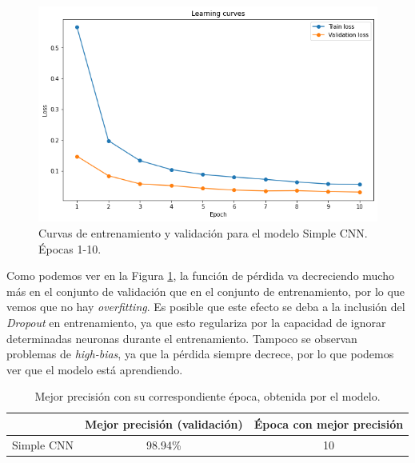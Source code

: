 \documentclass[12pt]{scrartcl}
\begin{document}
\begin{itemize}
    \begin{figure}[H]
        \centering
        \includegraphics[scale=0.48]{curvas1.png}
        \caption{Curvas de entrenamiento y validación para el modelo Simple CNN. Épocas 1-10.}
        \label{fig:curvas1}
    \end{figure}
    
    Como podemos ver en la Figura \ref{fig:curvas1}, la función de pérdida va decreciendo mucho más en el conjunto de validación que en el conjunto de entrenamiento, por lo que vemos que no hay \emph{overfitting}.
    Es posible que este efecto se deba a la inclusión del \emph{Dropout} en entrenamiento, ya que esto regulariza por la capacidad de ignorar determinadas neuronas durante el entrenamiento. Tampoco se observan 
    problemas de \emph{high-bias}, ya que la pérdida siempre decrece, por lo que podemos ver que el modelo está aprendiendo.

    \begin{table}[H]
        \centering
        \begin{tabular}{l c l}
        \multicolumn{1}{c}{}             & \cellcolor[HTML]{E3E7EC}Mejor precisión (validación) & \cellcolor[HTML]{E3E7EC} Época con mejor precisión \\ \hline
        \cellcolor[HTML]{E3E7EC}Simple CNN & 98.94\%                                              & \multicolumn{1}{c}{10}   \\ 
        \end{tabular}
        \caption{Mejor precisión con su correspondiente época, obtenida por el modelo.}
        \label{table:resultsprec}
        \end{table}


\end{itemize}
\end{document}
